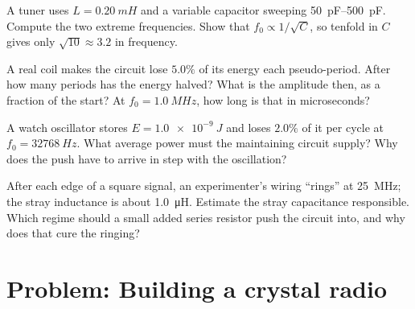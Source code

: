 \begin{exercise}[$\star\star\star$]\label{exo:g12:rlc-oscillations:12}
A tuner uses $L = \qty{0.20}{mH}$ and a variable capacitor sweeping
\qtyrange{50}{500}{pF}. Compute the two extreme frequencies. Show that
$f_0 \propto 1/\sqrt{C}$, so tenfold in $C$ gives only
$\sqrt{10} \approx 3.2$ in frequency.
\end{exercise}

\begin{exercise}[$\star\star\star$]\label{exo:g12:rlc-oscillations:13}
A real coil makes the circuit lose $5.0\%$ of its energy each
pseudo-period. After how many periods has the energy halved? What is
the amplitude then, as a fraction of the start? At
$f_0 = \qty{1.0}{MHz}$, how long is that in microseconds?
\end{exercise}

\begin{exercise}[$\star\star\star$]\label{exo:g12:rlc-oscillations:14}
A watch oscillator stores $E = \qty{1.0e-9}{J}$ and loses $2.0\%$ of
it per cycle at $f_0 = \qty{32768}{Hz}$. What average power must the
maintaining circuit supply? Why does the push have to arrive in step
with the oscillation?
\end{exercise}

\begin{exercise}[$\star\star\star$]\label{exo:g12:rlc-oscillations:15}
After each edge of a square signal, an experimenter's wiring ``rings''
at \qty{25}{MHz}; the stray inductance is about \qty{1.0}{\micro H}.
Estimate the stray capacitance responsible. Which regime should a
small added series resistor push the circuit into, and why does that
cure the ringing?
\end{exercise}

\section{Problem: Building a crystal radio}

